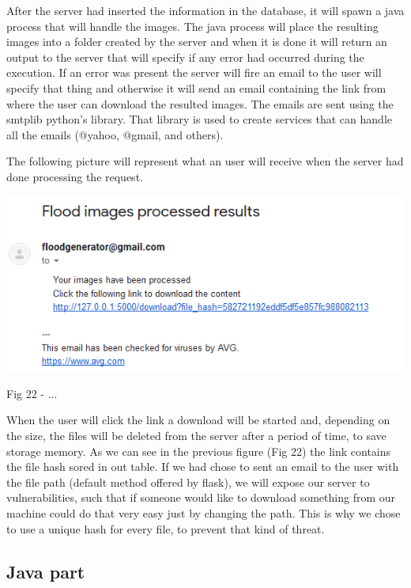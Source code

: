 \documentclass[12pt, a4paper]{report}
\begin{document}
After the server had inserted the information in the database, it will spawn a java process that will handle the images. The java process will place the resulting images into a folder created by the server and when it is done it will return an output to the server that will specify if any error had occurred during the execution. If an error was present the server will fire an email to the user will specify that thing and otherwise it will send an email containing the link from where the user can download the resulted images. The emails are sent using the smtplib python's library. That library is used to create services that can handle all the emails (@yahoo, @gmail, and others).
\par 

The following picture will represent what an user will receive when the server had done processing the request.

\medskip
\includegraphics[scale=1, center]{receive_email.png}
\begin{center}
Fig 22 - ... 
\end{center}
\par 

When the user will click the link a download will be started and, depending on the size, the files will be deleted from the server after a period of time, to save storage memory. As we can see in the previous figure (Fig 22) the link contains the file hash sored in out table. If we had chose to sent an email to the user with the file path (default method offered by flask), we will expose our server to vulnerabilities, such that if someone would like to download something from our machine could do that very easy just by changing the path. This is why we chose to use a unique hash for every file, to prevent that kind of threat.

\subsection{Java part}
\end{document}
